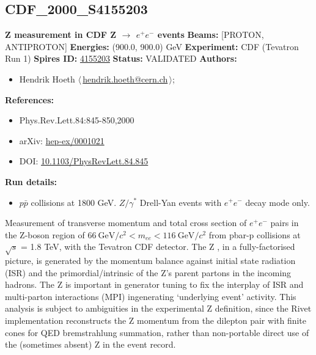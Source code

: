 \subsection[CDF\_2000\_S4155203]{CDF\_2000\_S4155203\,\cite{Affolder:1999jh}}
\textbf{Z \pT measurement in CDF Z \ensuremath{\to} $e^+e^-$ events}\newline
\textbf{Beams:} [PROTON, ANTIPROTON] \newline
\textbf{Energies:} (900.0, 900.0) GeV \newline
\textbf{Experiment:} CDF (Tevatron Run 1) \newline
\textbf{Spires ID:} \href{http://www.slac.stanford.edu/spires/find/hep/www?rawcmd=key+4155203}{4155203}\newline
\textbf{Status:} VALIDATED\newline
\textbf{Authors:}
\begin{itemize}
  \item Hendrik Hoeth $\langle\,$\href{mailto:hendrik.hoeth@cern.ch}{hendrik.hoeth@cern.ch}$\,\rangle$;
\end{itemize}
\textbf{References:}
\begin{itemize}
  \item Phys.Rev.Lett.84:845-850,2000
  \item arXiv: \href{http://arxiv.org/abs/hep-ex/0001021}{hep-ex/0001021}
  \item DOI: \href{http://dx.doi.org/10.1103/PhysRevLett.84.845}{10.1103/PhysRevLett.84.845}
\end{itemize}
\textbf{Run details:}
\begin{itemize}

  \item $p\bar{p}$ collisions at 1800 GeV. $Z/\gamma^*$ Drell-Yan events with $e^+e^-$ decay mode only.\end{itemize}

\noindent Measurement of transverse momentum and total cross section of $e^+e^-$ pairs in the Z-boson region of $66~\text{GeV}/c^2 < m_{ee} < 116~\text{GeV}/c^2$ from pbar-p collisions at \ensuremath{\sqrt{s}} = 1.8 TeV, with the Tevatron CDF detector.  The Z \pT, in a fully-factorised picture, is generated by the momentum balance against initial state radiation (ISR) and the primordial/intrinsic \pT of the Z's parent partons in the incoming hadrons. The Z \pT is important in generator tuning to fix the interplay of ISR and multi-parton interactions (MPI) ingenerating `underlying event' activity.
This analysis is subject to ambiguities in the experimental Z \pT definition, since the Rivet implementation reconstructs the Z momentum from the dilepton pair with finite cones for QED bremstrahlung summation, rather than non-portable direct use of the (sometimes absent) Z in the event record.

